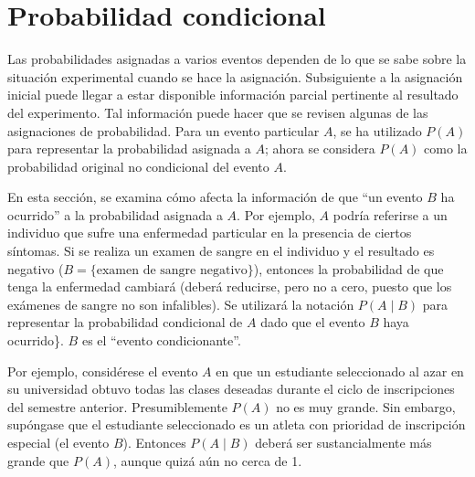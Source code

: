 \documentclass[
  11pt,
]{book}
\theoremstyle{definition}
\theoremstyle{definition}
\theoremstyle{definition}
\theoremstyle{definition}
\theoremstyle{remark}
\begin{document}
\section{Probabilidad condicional}\label{probabilidad-probabilidad-condicional}

Las probabilidades asignadas a varios eventos dependen de lo que se sabe sobre la situación experimental cuando se hace la asignación. Subsiguiente a la asignación inicial puede llegar a estar disponible información parcial pertinente al resultado del experimento. Tal información puede hacer que se revisen algunas de las asignaciones de probabilidad. Para un evento particular \(A\), se ha utilizado \(P(A)\) para representar la probabilidad asignada a \(A\); ahora se considera \(P(A)\) como la probabilidad original no condicional del evento \(A\). \citep[página 67]{Devore}

En esta sección, se examina cómo afecta la información de que ``un evento \(B\) ha ocurrido'' a la probabilidad asignada a \(A\). Por ejemplo, \(A\) podría referirse a un individuo que sufre una enfermedad particular en la presencia de ciertos síntomas. Si se realiza un examen de sangre en el individuo y el resultado es negativo (\(B = \{\text{examen de sangre negativo}\}\)), entonces la probabilidad de que tenga la enfermedad cambiará (deberá reducirse, pero no a cero, puesto que los exámenes de sangre no son infalibles). Se utilizará la notación \(P(A \mid B)\) para representar la probabilidad condicional de \(A\) dado que el evento \(B\) haya ocurrido\}. \(B\) es el ``evento condicionante''.

Por ejemplo, considérese el evento \(A\) en que un estudiante seleccionado al azar en su universidad obtuvo todas las clases deseadas durante el ciclo de inscripciones del semestre anterior. Presumiblemente \(P(A)\) no es muy grande. Sin embargo, supóngase que el estudiante seleccionado es un atleta con prioridad de inscripción especial (el evento \(B\)). Entonces \(P(A \mid B)\) deberá ser sustancialmente más grande que \(P(A)\), aunque quizá aún no cerca de 1.
\end{document}

